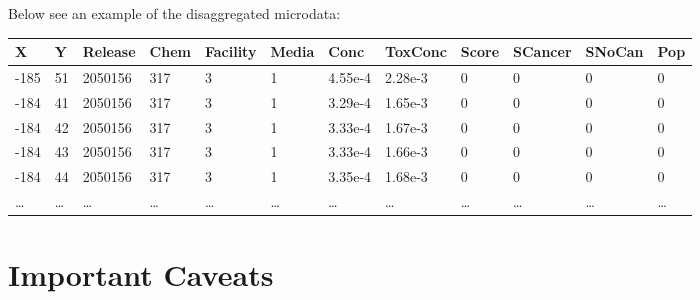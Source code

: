 \documentclass[12pt,twoside]{dukestatscithesis}
\theoremstyle{definition}
\theoremstyle{definition}
\theoremstyle{definition}
\theoremstyle{remark}
\begin{document}
Below see an example of the disaggregated microdata:
\begin{longtable}[]{@{}llllllllllll@{}}
\toprule
X & Y & Release & Chem & Facility & Media & Conc & ToxConc & Score &
SCancer & SNoCan & Pop\tabularnewline
\midrule
\endhead
-185 & 51 & 2050156 & 317 & 3 & 1 & 4.55e-4 & 2.28e-3 & 0 & 0 & 0 &
0\tabularnewline
-184 & 41 & 2050156 & 317 & 3 & 1 & 3.29e-4 & 1.65e-3 & 0 & 0 & 0 &
0\tabularnewline
-184 & 42 & 2050156 & 317 & 3 & 1 & 3.33e-4 & 1.67e-3 & 0 & 0 & 0 &
0\tabularnewline
-184 & 43 & 2050156 & 317 & 3 & 1 & 3.33e-4 & 1.66e-3 & 0 & 0 & 0 &
0\tabularnewline
-184 & 44 & 2050156 & 317 & 3 & 1 & 3.35e-4 & 1.68e-3 & 0 & 0 & 0 &
0\tabularnewline
\ldots{} & \ldots{} & \ldots{} & \ldots{} & \ldots{} & \ldots{} &
\ldots{} & \ldots{} & \ldots{} & \ldots{} & \ldots{} &
\ldots{}\tabularnewline
\bottomrule
\end{longtable}
\section{Important Caveats}\label{important-caveats}
\end{document}
